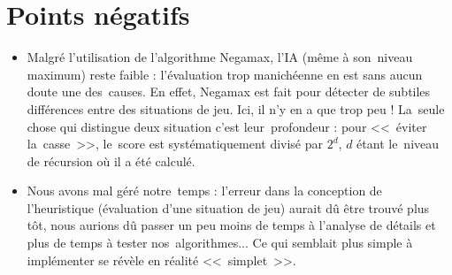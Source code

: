 \section{Points négatifs}
\begin{itemize}

	\item Malgré l'utilisation de l'algorithme Negamax, l'IA (même à son~niveau maximum) reste faible : 
            l'évaluation trop manichéenne en est sans aucun doute une des~causes. En effet, Negamax est fait pour 
            détecter de subtiles différences entre des situations de jeu. Ici, il n'y en a que trop peu ! 
            La~seule chose qui distingue deux situation c'est leur~profondeur : pour <<~éviter la~casse~>>, 
            le~score est systématiquement divisé par $2^d$, $d$ étant le~niveau de récursion où il a été calculé. 
            
    \item Nous avons mal géré notre~temps : l'erreur dans la conception de l'heuristique (évaluation d'une situation de jeu) 
            aurait dû être trouvé plus tôt, nous aurions dû passer un peu moins de temps à l'analyse de détails 
            et plus de temps à tester nos~algorithmes... Ce qui semblait plus simple à implémenter 
            se révèle en réalité <<~simplet~>>.
    
\end{itemize}